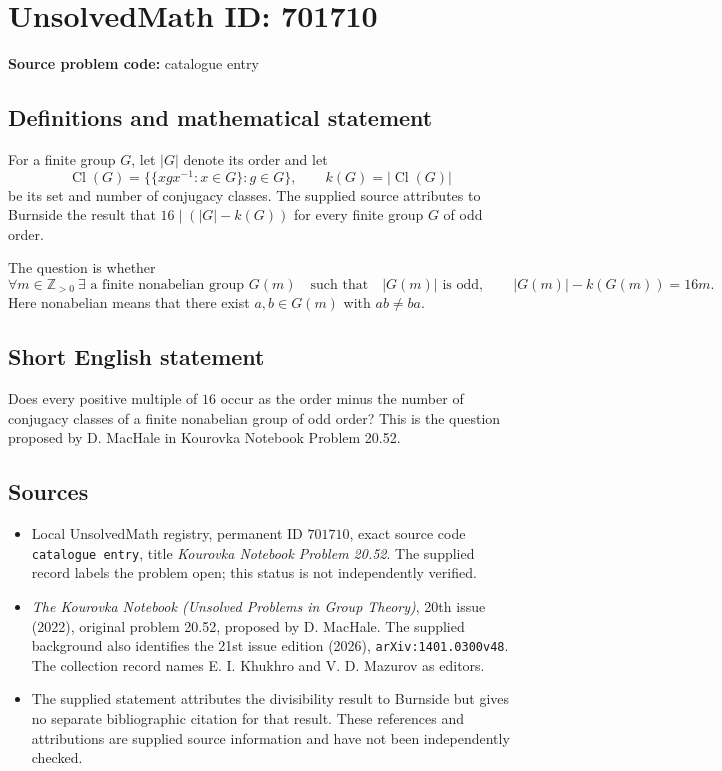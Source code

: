 \documentclass[11pt]{article}
\newcommand{\Z}{\mathbb{Z}}
\begin{document}
\section*{UnsolvedMath ID: 701710}
\textbf{Source problem code:} catalogue entry
\subsection{Definitions and mathematical statement}
For a finite group \(G\), let \(|G|\) denote its order and let
\[
\operatorname{Cl}(G)=\bigl\{\{xgx^{-1}:x\in G\}:g\in G\bigr\},\qquad k(G)=|\operatorname{Cl}(G)|
\]
be its set and number of conjugacy classes. The supplied source attributes to Burnside the result that \(16\mid(|G|-k(G))\) for every finite group \(G\) of odd order.

The question is whether
\[
\forall m\in\Z_{>0}\ \exists\text{ a finite nonabelian group }G(m)
\quad\text{such that}\quad
|G(m)|\text{ is odd},\qquad |G(m)|-k(G(m))=16m.
\]
Here nonabelian means that there exist \(a,b\in G(m)\) with \(ab\ne ba\).
\subsection{Short English statement}
Does every positive multiple of \(16\) occur as the order minus the number of conjugacy classes of a finite nonabelian group of odd order? This is the question proposed by D. MacHale in Kourovka Notebook Problem 20.52.
\subsection{Sources}
\begin{itemize}
\item Local UnsolvedMath registry, permanent ID \(701710\), exact source code \texttt{catalogue entry}, title \emph{Kourovka Notebook Problem 20.52}. The supplied record labels the problem open; this status is not independently verified.
\item \emph{The Kourovka Notebook (Unsolved Problems in Group Theory)}, 20th issue (2022), original problem 20.52, proposed by D. MacHale. The supplied background also identifies the 21st issue edition (2026), \texttt{arXiv:1401.0300v48}. The collection record names E. I. Khukhro and V. D. Mazurov as editors.
\item The supplied statement attributes the divisibility result to Burnside but gives no separate bibliographic citation for that result. These references and attributions are supplied source information and have not been independently checked.
\end{itemize}
\end{document}
